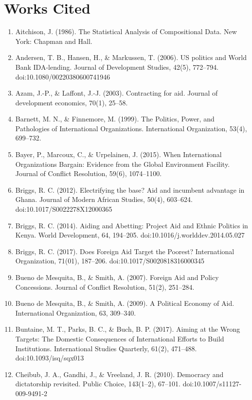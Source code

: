 \documentclass{article}
\begin{document}
\newpage
\section*{Works Cited}
\begin{singlespace}
\begin{enumerate}
 

	\item Aitchison, J. (1986). The Statistical Analysis of Compositional Data. New York: Chapman and Hall.
	\item Andersen, T. B., Hansen, H., \& Markussen, T. (2006). US politics and World Bank IDA-lending. Journal of Development Studies, 42(5), 772–794. doi:10.1080/00220380600741946
	\item Azam, J.-P., \& Laffont, J.-J. (2003). Contracting for aid. Journal of development economics, 70(1), 25–58.
	\item Barnett, M. N., \& Finnemore, M. (1999). The Politics, Power, and Pathologies of International Organizations. International Organization, 53(4), 699–732.
	\item Bayer, P., Marcoux, C., \& Urpelainen, J. (2015). When International Organizations Bargain: Evidence from the Global Environment Facility. Journal of Conflict Resolution, 59(6), 1074–1100.
	\item Briggs, R. C. (2012). Electrifying the base? Aid and incumbent advantage in Ghana. Journal of Modern African Studies, 50(4), 603–624. doi:10.1017/S0022278X12000365
	\item Briggs, R. C. (2014). Aiding and Abetting: Project Aid and Ethnic Politics in Kenya. World Development, 64, 194–205. doi:10.1016/j.worlddev.2014.05.027
	\item Briggs, R. C. (2017). Does Foreign Aid Target the Poorest? International Organization, 71(01), 187–206. doi:10.1017/S0020818316000345
	\item Bueno de Mesquita, B., \& Smith, A. (2007). Foreign Aid and Policy Concessions. Journal of Conflict Resolution, 51(2), 251–284.
	\item Bueno de Mesquita, B., \& Smith, A. (2009). A Political Economy of Aid. International Organization, 63, 309–340.
	\item Buntaine, M. T., Parks, B. C., \& Buch, B. P. (2017). Aiming at the Wrong Targets: The Domestic Consequences of International Efforts to Build Institutions. International Studies Quarterly, 61(2), 471–488. doi:10.1093/isq/sqx013
	\item Cheibub, J. A., Gandhi, J., \& Vreeland, J. R. (2010). Democracy and dictatorship revisited. Public Choice, 143(1–2), 67–101. doi:10.1007/s11127-009-9491-2

\end{enumerate}
\end{singlespace}
\end{document}
